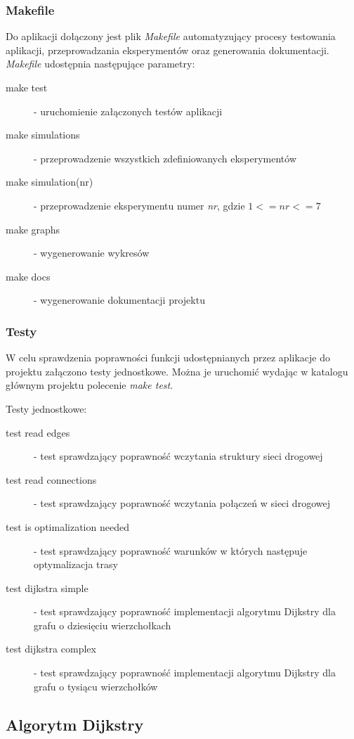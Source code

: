 \documentclass[11pt,a4paper]{article}
\begin{document}
\subsubsection{Makefile}

Do aplikacji dołączony jest plik \textit{Makefile} automatyzujący procesy testowania aplikacji, przeprowadzania eksperymentów oraz generowania dokumentacji.\\[0.5cm]
\textit{Makefile} udostępnia następujące parametry:
\begin{description}
	\item[make test] - uruchomienie załączonych testów aplikacji
	\item[make simulations] - przeprowadzenie wszystkich zdefiniowanych eksperymentów
	\item[make simulation(nr)] - przeprowadzenie eksperymentu numer \textit{nr}, gdzie $1 <= nr <= 7$
	\item[make graphs] - wygenerowanie wykresów
	\item[make docs] - wygenerowanie dokumentacji projektu
\end{description}

\subsubsection{Testy}

W celu sprawdzenia poprawności funkcji udostępnianych przez aplikacje do projektu załączono testy jednostkowe. Można je uruchomić wydając w katalogu głównym projektu polecenie \textit{make test}. 

Testy jednostkowe:
\begin{description}
	\item[test read edges] - test sprawdzający poprawność wczytania struktury sieci drogowej
	\item[test read connections] - test sprawdzający poprawność wczytania połączeń w sieci drogowej
	\item[test is optimalization needed] - test sprawdzający poprawność warunków w których następuje optymalizacja trasy
	\item[test dijkstra simple] - test sprawdzający poprawność implementacji algorytmu Dijkstry dla grafu o dziesięciu wierzchołkach
	\item[test dijkstra complex] - test sprawdzający poprawność implementacji algorytmu Dijkstry dla grafu o tysiącu wierzchołków
\end{description}

\subsection{Algorytm Dijkstry}
\end{document}
